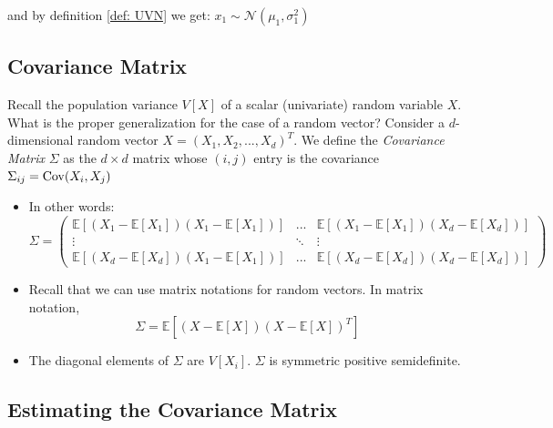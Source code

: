 {and by definition \ref{def: UVN} we get:
$x_1\sim\mathcal{N}({\mu_1},{\sigma_1^2})$
\\


\subsection{Covariance Matrix}

\begin{definition}
Recall the population variance $V[X]$ of a scalar (univariate) random variable $X$. What is the proper generalization for the case of a random vector?
Consider a $d$-dimensional random vector $ {X} =(X_{1},X_{2},...,X_d)^T$.
We define the  {\em Covariance Matrix} $\Sigma$ as the $d \times d$ matrix whose $ (i,j)$ entry is the covariance $\Sigma_{ij}=\mathrm{Cov}(X_i,X_j)$
\begin{itemize}
    \item In other words:
\begingroup
\footnotesize %
$$\Sigma=\left(\begin{array}{ccc}
\mathbb{E}\left[\left(X_{1}-\mathbb{E}\left[X_{1}\right]\right)\left(X_{1}-\mathbb{E}\left[X_{1}\right]\right)\right] & ... & \mathbb{E}\left[\left(X_{1}-\mathbb{E}\left[X_{1}\right]\right)\left(X_{d}-\mathbb{E}\left[X_{d}\right]\right)\right]\\
\vdots & \ddots & \vdots\\
\mathbb{E}\left[\left(X_{d}-\mathbb{E}\left[X_{d}\right]\right)\left(X_{1}-\mathbb{E}\left[X_{1}\right]\right)\right] & ... & \mathbb{E}\left[\left(X_{d}-\mathbb{E}\left[X_{d}\right]\right)\left(X_{d}-\mathbb{E}\left[X_{d}\right]\right)\right]
\end{array}\right)$$
\endgroup

\item Recall that we can use  matrix notations for random vectors. In matrix notation, 
$$\Sigma=\mathbb{E}[({X} - {\mathbb{E}\left[X\right]} )({X} -{\mathbb{E}\left[X\right]} )^{T}]$$

\item The diagonal elements of $\Sigma$ are $V[X_i]$. $\Sigma$ is symmetric positive semidefinite. 

\end{itemize}

\end{definition}

\subsection{Estimating the Covariance Matrix}

}
